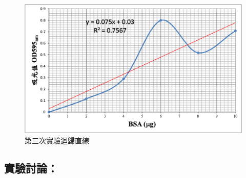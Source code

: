 \begin{figure}[H]\centering
\begin{minipage}[b]{0.4\textwidth} %
\centering
\includegraphics[width=1\textwidth]{paste_src/2023-09-28-17-19-36.png}
\caption{第三次實驗迴歸直線}
\label{}
\end{minipage}
\end{figure}

\subsection*{實驗討論：}

